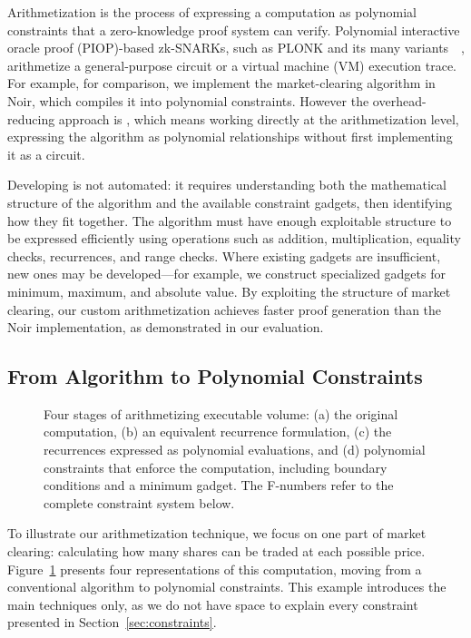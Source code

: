 Arithmetization is the process of expressing a computation as polynomial constraints that a zero-knowledge proof system can verify. Polynomial interactive oracle proof (PIOP)-based zk-SNARKs, such as PLONK and its many variants~~\cite{GWC19,CBBZ23}, arithmetize a general-purpose circuit or a virtual machine (VM) execution trace. For example, for comparison, we implement the market-clearing algorithm in Noir, which compiles it into polynomial constraints. However the overhead-reducing approach is \textit{\ari}, which means working directly at the arithmetization level, expressing the algorithm as polynomial relationships without first implementing it as a circuit.

Developing \ari is not automated: it requires understanding both the mathematical structure of the algorithm and the available constraint gadgets, then identifying how they fit together. The algorithm must have enough exploitable structure to be expressed efficiently using operations such as addition, multiplication, equality checks, recurrences, and range checks. Where existing gadgets are insufficient, new ones may be developed---for example, we construct specialized gadgets for minimum, maximum, and absolute value. By exploiting the structure of market clearing, our custom arithmetization achieves faster proof generation than the Noir implementation, as demonstrated in our evaluation.


\subsection{From Algorithm to Polynomial Constraints}

\begin{figure}[t]
\centering

\caption{Four stages of arithmetizing executable volume: (a) the original computation, (b) an equivalent recurrence formulation, (c) the recurrences expressed as polynomial evaluations, and (d) polynomial constraints that enforce the computation, including boundary conditions and a minimum gadget. The F-numbers refer to the complete constraint system below.}
\label{fig:arithmetization}
\end{figure}

To illustrate our arithmetization technique, we focus on one part of market clearing: calculating how many shares can be traded at each possible price. Figure~\ref{fig:arithmetization} presents four representations of this computation, moving from a conventional algorithm to polynomial constraints. This example introduces the main techniques only, as we do not have space to explain every constraint presented in Section~\ref{sec:constraints}.

